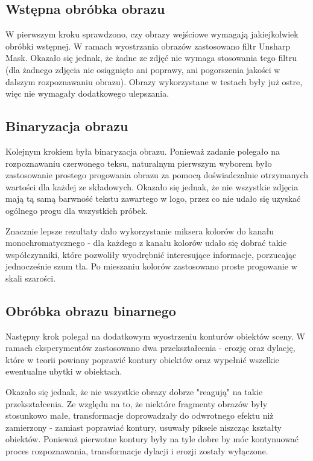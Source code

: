 \documentclass[11pt,a4paper]{article} %
\numberwithin{equation}{section} %
\numberwithin{figure}{section} %
\numberwithin{table}{section} %
\begin{document}
\subsection{Wstępna obróbka obrazu}

W pierwszym kroku sprawdzono, czy obrazy wejściowe wymagają jakiejkolwiek obróbki wstępnej. W ramach wyostrzania obrazów zastosowano filtr Unsharp Mask. Okazało się jednak, że żadne ze zdjęć nie wymaga stosowania tego filtru (dla żadnego zdjęcia nie osiągnięto ani poprawy, ani pogorszenia jakości w dalszym rozpoznawaniu obrazu). Obrazy wykorzystane w testach były już ostre, więc nie wymagały dodatkowego ulepszania.

\subsection{Binaryzacja obrazu}

Kolejnym krokiem była binaryzacja obrazu. Ponieważ zadanie polegało na rozpoznawaniu czerwonego teksu, naturalnym pierwszym wyborem było zastosowanie prostego progowania obrazu za pomocą doświadczalnie otrzymanych wartości dla każdej ze składowych. Okazało się jednak, że nie wszystkie zdjęcia mają tą samą barwność tekstu zawartego w logo, przez co nie udało się uzyskać ogólnego progu dla wszystkich próbek.

Znacznie lepsze rezultaty dało wykorzystanie miksera kolorów do kanału monochromatycznego - dla każdego z kanału kolorów udało się dobrać takie współczynniki, które pozwoliły wyodrębnić interesujące informacje, porzucając jednocześnie szum tła. Po mieszaniu kolorów zastosowano proste progowanie w skali szarości.

\subsection{Obróbka obrazu binarnego}

Następny krok polegał na dodatkowym wyostrzeniu konturów obiektów sceny. W ramach eksperymentów zastosowano dwa przekształcenia - erozję oraz dylację, które w teorii powinny poprawić kontury obiektów oraz wypełnić wszelkie ewentualne ubytki w obiektach.

Okazało się jednak, że nie wszystkie obrazy dobrze "reagują" na takie przekształcenia. Ze względu na to, że niektóre fragmenty obrazów były stosunkowo małe, transformacje doprowadzały do odwrotnego efektu niż zamierzony - zamiast poprawiać kontury, usuwały piksele niszcząc kształty obiektów. Ponieważ pierwotne kontury były na tyle dobre by móc kontynuować proces rozpoznawania, transformacje dylacji i erozji zostały wyłączone.
\end{document}
